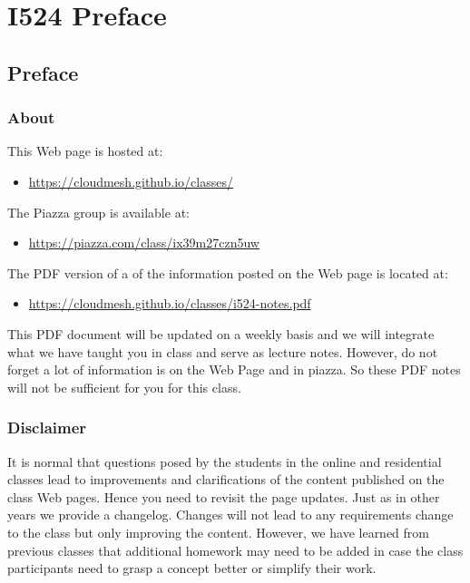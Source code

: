 


\chapter{I524 Preface}
\label{\detokenize{notes:i524-notes}}\label{\detokenize{notes:i524-preface}}

\section{Preface}
\label{\detokenize{i524/preface/index::doc}}\label{\detokenize{i524/preface/index:preface}}

\subsection{About}
\label{\detokenize{i524/preface/about:about}}\label{\detokenize{i524/preface/about::doc}}
This Web page is hosted at:
\begin{itemize}
\item {} 
\url{https://cloudmesh.github.io/classes/}

\end{itemize}

The Piazza group is available at:
\begin{itemize}
\item {} 
\url{https://piazza.com/class/ix39m27czn5uw}

\end{itemize}

The PDF version of a  of the information posted on the Web
page is located at:
\begin{itemize}
\item {} 
\url{https://cloudmesh.github.io/classes/i524-notes.pdf}

\end{itemize}

This PDF document will be updated on a weekly basis and we will
integrate what we have taught you in class and serve as lecture notes.
However, do not forget a lot of information is on the Web Page and in
piazza. So these PDF notes will not be sufficient for you for this
class.


\subsection{Disclaimer}
\label{\detokenize{i524/preface/disclaimer::doc}}\label{\detokenize{i524/preface/disclaimer:disclaimer}}
It is normal that questions posed by the students in the
online and residential classes lead to improvements and clarifications
of the content published on the class Web pages. Hence you need to
revisit the page updates. Just as in other years we provide a
changelog. Changes will not lead to any requirements change to the class
but only improving the content. However, we have learned from previous
classes that additional homework may need to be added in case the
class participants need to grasp a concept better or simplify their
work.

